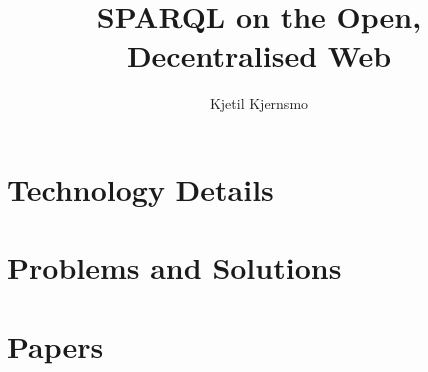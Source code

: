 \documentclass[a4paper, 12pt]{uiophd}
\begin{document}
\title{SPARQL on the Open, Decentralised Web}
\author{Kjetil Kjernsmo}


\frontmatter
\maketitle



\tableofcontents
\mainmatter






\chapter{Technology Details}



\chapter{Problems and Solutions}









\chapter{Papers}







\end{document}
